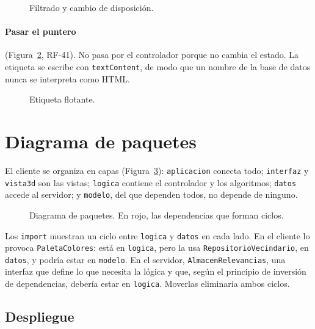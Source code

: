 \begin{figure}[htbp]
  \centering
  \caption{Filtrado y cambio de disposición.}
  \label{fig:sec-filtrar}
\end{figure}

\paragraph{Pasar el puntero} (Figura~\ref{fig:sec-puntero}, RF-41). No pasa por el controlador porque no cambia el estado. La etiqueta se escribe con \texttt{textContent}, de modo que un nombre de la base de datos nunca se interpreta como HTML.

\begin{figure}[htbp]
  \centering
  \caption{Etiqueta flotante.}
  \label{fig:sec-puntero}
\end{figure}

\section{Diagrama de paquetes}
\label{sec:paquetes}

El cliente se organiza en capas (Figura~\ref{fig:paquetes}): \texttt{aplicacion} conecta todo; \texttt{interfaz} y \texttt{vista3d} son las vistas; \texttt{logica} contiene el controlador y los algoritmos; \texttt{datos} accede al servidor; y \texttt{modelo}, del que dependen todos, no depende de ninguno.

\begin{figure}[htbp]
  \centering
  \caption{Diagrama de paquetes. En rojo, las dependencias que forman ciclos.}
  \label{fig:paquetes}
\end{figure}

Los \texttt{import} muestran un ciclo entre \texttt{logica} y \texttt{datos} en cada lado. En el cliente lo provoca \texttt{PaletaColores}: está en \texttt{logica}, pero la usa \texttt{RepositorioVecindario}, en \texttt{datos}, y podría estar en \texttt{modelo}. En el servidor, \texttt{AlmacenRelevancias}, una interfaz que define lo que necesita la lógica y que, según el principio de inversión de dependencias, debería estar en \texttt{logica}. Moverlas eliminaría ambos ciclos. 

\subsection{Despliegue}

